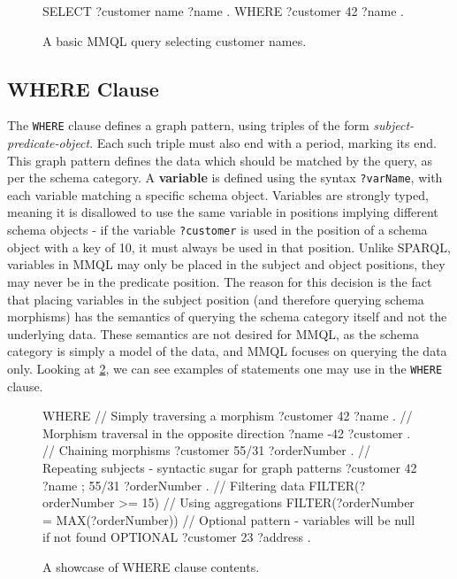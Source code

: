 \begin{figure}[ht]
\begin{code}
SELECT {
    ?customer name ?name .
}
WHERE {
    ?customer 42 ?name .
}
\end{code}
\caption{A basic MMQL query selecting customer names.}\label{mmql:figure:basic}
\end{figure}

\subsection{WHERE Clause}
\label{mmql:subsection:where}

The \texttt{WHERE} clause defines a graph pattern, using triples of the form \textit{subject-predicate-object}.
Each such triple must also end with a period, marking its end.
This graph pattern defines the data which should be matched by the query, as per the schema category.
A \textbf{variable} is defined using the syntax \texttt{?varName}, with each variable matching a specific schema object.
Variables are strongly typed, meaning it is disallowed to use the same variable in positions implying different schema objects - if the variable \texttt{?customer} is used in the position of a schema object with a key of 10, it must always be used in that position.
Unlike SPARQL, variables in MMQL may only be placed in the subject and object positions, they may never be in the predicate position.
The reason for this decision is the fact that placing variables in the subject position (and therefore querying schema morphisms) has the semantics of querying the schema category itself and not the underlying data.
These semantics are not desired for MMQL, as the schema category is simply a model of the data, and MMQL focuses on querying the data only.
Looking at \cref{mmql:figure:where}, we can see examples of statements one may use in the \texttt{WHERE} clause.

\begin{figure}[ht]
\begin{code}
WHERE {
    // Simply traversing a morphism
    ?customer 42 ?name .
    // Morphism traversal in the opposite direction
    ?name -42 ?customer .
    // Chaining morphisms
    ?customer 55/31 ?orderNumber .
    // Repeating subjects - syntactic sugar for graph patterns
    ?customer 42 ?name ;
        55/31 ?orderNumber .
    // Filtering data
    FILTER(?orderNumber >= 15)
    // Using aggregations
    FILTER(?orderNumber = MAX(?orderNumber))
    // Optional pattern - variables will be null if not found
    OPTIONAL {
        ?customer 23 ?address .
    }
}
\end{code}
\caption{A showcase of WHERE clause contents.}\label{mmql:figure:where}
\end{figure}

